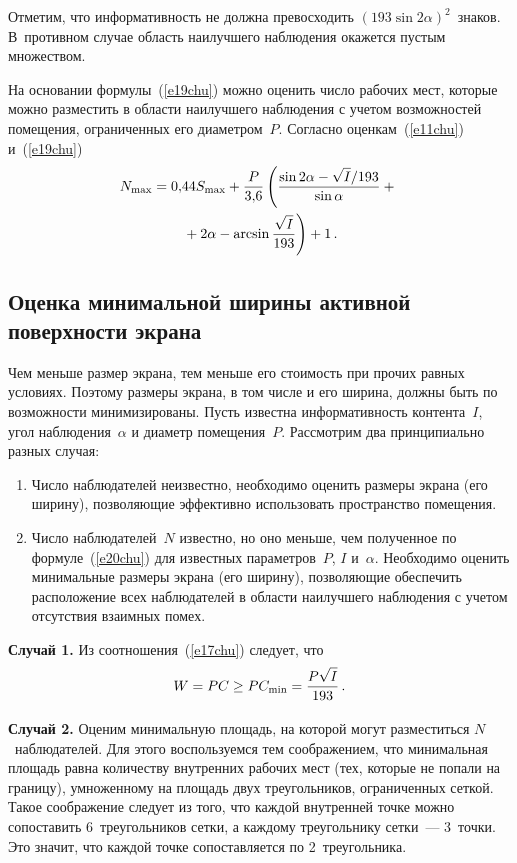 \begin{multicols}{2}
     Отметим, что информативность не должна превосходить 
$(193\sin2\alpha)^2$~знаков. В~противном случае область наилучшего 
наблюдения окажется пустым множеством.

На основании формулы~(\ref{e19chu}) можно оценить число рабочих мест, 
которые можно разместить в области наилучшего наблюдения с учетом 
возможностей помещения, ограниченных его диа\-мет\-ром~$P$. Согласно 
оценкам~(\ref{e11chu}) и~(\ref{e19chu})
\begin{multline}
N_{\max}=0{,}44S_{\max}+\displaystyle\frac{\displaystyle P\mathstrut}{\displaystyle 3{,}6\mathstrut}\left(\displaystyle\frac{\displaystyle \sin2\alpha-\sqrt{I}/193\mathstrut}{\displaystyle \sin\alpha\mathstrut}+{}\right.\\
\left.{}+2\alpha-
\arcsin\displaystyle\frac{\displaystyle \sqrt{I}\mathstrut}{\displaystyle 193\mathstrut}\right)+1\,.
\label{e20chu}
\end{multline}

\subsection{Оценка минимальной ширины активной поверхности 
экрана}

Чем меньше размер экрана, тем меньше его стои\-мость при прочих равных 
условиях. Поэтому размеры экрана, в том числе и его ширина, должны быть 
по возможности минимизированы. Пусть известна информативность 
контента~$I$, угол наблюдения~$\alpha$ и диаметр помещения~$P$. 
Рассмотрим два принципиально разных случая:
\begin{enumerate}[1.]
\item Число наблюдателей неизвестно, необходимо оценить размеры 
экрана (его ширину), позволяющие эффективно использовать 
пространство помещения.
\item Число наблюдателей~$N$ известно, но оно меньше, чем полученное 
по формуле~(\ref{e20chu}) для известных параметров~$P$, $I$ и~$\alpha$. 
Необходимо оценить минимальные размеры экрана (его ширину), 
позволяющие обеспечить расположение всех наблюдателей в области 
наилучшего наблюдения с учетом отсутствия взаимных помех.
\end{enumerate}

\smallskip

\noindent
\textbf{Случай 1.} Из соотношения~(\ref{e17chu}) следует, что
\begin{equation*}
W= PC\geq PC_{\min}=\displaystyle\frac{\displaystyle P\sqrt{I}\mathstrut}{\displaystyle 193\mathstrut}\,.
\end{equation*}

\smallskip

\noindent
\textbf{Случай 2.} Оценим минимальную площадь, на которой могут 
разместиться $N$~наблюдателей. Для этого воспользуемся тем 
соображением, что минимальная площадь равна количеству внутренних 
рабочих мест (тех, которые не попали на границу), умноженному на площадь 
двух треугольников, ограниченных сеткой. Такое соображение следует из 
того, что каждой внутренней точке можно сопоставить 6~треугольников 
сетки, а каждому треугольнику сетки~--- 3~точки. Это значит, что каждой 
точке сопоставляется по 2~треугольника.


\end{multicols}
